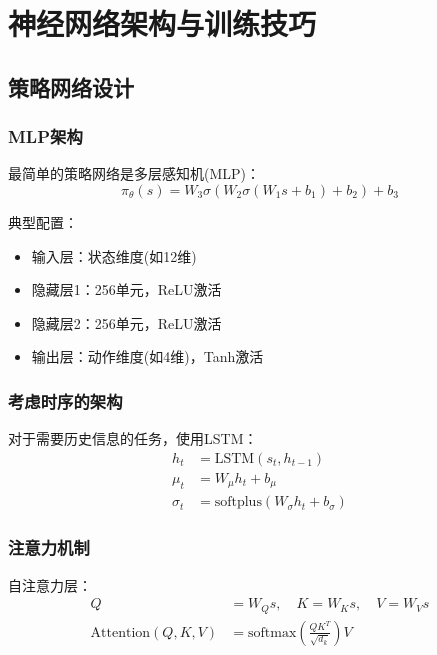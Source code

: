 \documentclass[12pt,a4paper]{ctexart}
\begin{document}
\section{神经网络架构与训练技巧}\label{sec:network_architecture}

\subsection{策略网络设计}

\subsubsection{MLP架构}

最简单的策略网络是多层感知机(MLP)：
\begin{equation}
\pi_\theta(s) = W_3\sigma(W_2\sigma(W_1s + b_1) + b_2) + b_3
\end{equation}

典型配置：
\begin{itemize}
    \item 输入层：状态维度(如12维)
    \item 隐藏层1：256单元，ReLU激活
    \item 隐藏层2：256单元，ReLU激活
    \item 输出层：动作维度(如4维)，Tanh激活
\end{itemize}

\subsubsection{考虑时序的架构}

对于需要历史信息的任务，使用LSTM：
\begin{align}
h_t &= \text{LSTM}(s_t, h_{t-1}) \\
\mu_t &= W_\mu h_t + b_\mu \\
\sigma_t &= \text{softplus}(W_\sigma h_t + b_\sigma)
\end{align}

\subsubsection{注意力机制}

自注意力层：
\begin{align}
Q &= W_Q s, \quad K = W_K s, \quad V = W_V s \\
\text{Attention}(Q,K,V) &= \text{softmax}\left(\frac{QK^T}{\sqrt{d_k}}\right)V
\end{align}
\end{document}
